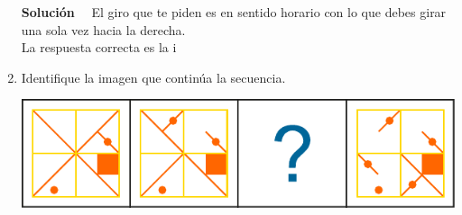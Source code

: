 \documentclass[11pt, a4paper]{article} %
\theoremstyle{dotlessP}
\theoremstyle{dotlessS}
\begin{document}
\begin{enumerate}[label=\color{dg}\theenumi.]
      \begin{figure}[h!]
       \centering
       \qquad 
		\qquad 
        		\qquad 
\end{figure}
 \textbf{Solución} \ \
 El giro que te piden es en sentido horario con lo que debes girar una sola vez hacia la derecha. \\
 {\color{dh} La respuesta correcta es la i}
   \item {\color{db} Identifique la imagen que continúa  la secuencia. 
        }
         \begin{center}
    \includegraphics[scale=1]{Figuras/132_1.pdf}
    \end{center}
    

\end{enumerate}
\end{document}
